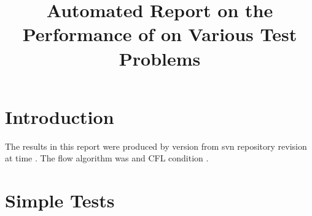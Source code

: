 \documentclass[11pt,a4paper]{report}
\begin{document}
 

\title{Automated Report on the Performance of \anuga{} on Various Test Problems}
\maketitle
\tableofcontents

\chapter{Introduction}

The results in this report were produced by \anuga{} version \majorR{} 
from svn repository revision \minorR{} at time \timeR.
The flow algorithm was \alg{} and CFL condition \cfl.

\chapter{Simple Tests}













\appendix
\end{document}
